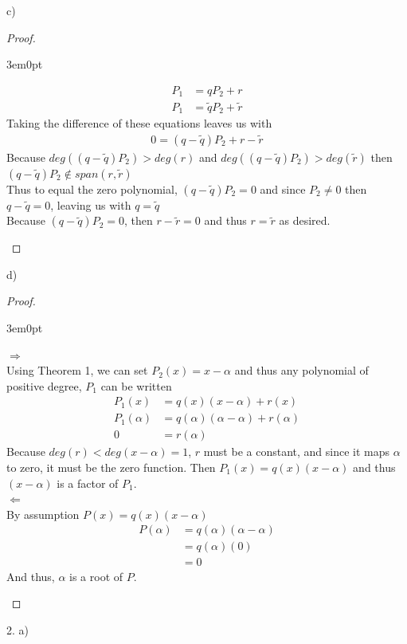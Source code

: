 \documentclass[11pt]{article}
\newcommand{\bproof}{\begin{proof}
$ $ \\
\begin{adjustwidth}{3em}{0pt}
}
\newcommand{\eproof}{\end{adjustwidth}
\end{proof}}
\begin{document}
\begin{flushleft}
c) \bigskip

\bproof
	\begin{align*}
	P_1 &= qP_2 + r \\
	P_1 &= \tilde{q}P_2 + \tilde{r}
	\end{align*}
	Taking the difference of these equations leaves us with
	\begin{align*}
	0 = (q - \tilde{q})P_2 +r - \tilde{r}
	\end{align*}
	Because $deg((q - \tilde{q})P_2) > deg(r)$ and $deg((q - \tilde{q})P_2) > deg( \tilde{r})$ then $(q - \tilde{q})P_2 \notin span(r, \tilde{r})$ \\
	Thus to equal the zero polynomial, $(q - \tilde{q})P_2 = 0$ and since $P_2 \neq 0$ then $q - \tilde{q} = 0$, leaving us with $q = \tilde{q}$ \\
	Because $(q - \tilde{q})P_2 = 0$, then $r - \tilde{r} = 0$ and thus $r = \tilde{r}$ as desired.
\eproof

\newpage

d) \bigskip

\bproof
	$\Rightarrow$ \\
	Using Theorem 1, we can set $P_2(x) = x - \alpha$ and thus any polynomial of positive degree, $P_1$ can be written
	\begin{align*}
	P_1(x) &= q(x)(x - \alpha) + r(x) \\
	P_1(\alpha) &= q(\alpha)(\alpha - \alpha) + r(\alpha) \\
	0 &= r(\alpha)
	\end{align*}
	Because $deg(r) < deg(x- \alpha) = 1$, $r$ must be a constant, and since it maps $\alpha$ to zero, it must be the zero function. Then $P_1(x) = q(x)(x - \alpha)$ and thus $(x - \alpha)$ is a factor of $P_1$. \\ \bigskip
	$\Leftarrow$ \\
	By assumption $P(x) = q(x)(x - \alpha)$
	\begin{align*}
	P(\alpha) &= q(\alpha)(\alpha - \alpha) \\
	&= q(\alpha)(0) \\
	&= 0 
	\end{align*}
	And thus, $\alpha$ is a root of $P$.
	
\eproof

\newpage

2. a) \bigskip \\
\begin{figure}[h]
\centering


\end{figure}
\end{flushleft}
\end{document}
